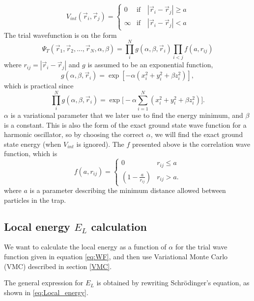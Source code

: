 \documentclass[norsk,a4paper,12pt]{article}
\begin{document}
\begin{equation}
\label{eq:V_int}
V_{int}(\vec{r}_i, \vec{r}_j)=
\begin{cases} 
0 & \text{if}\quad |\vec{r}_i-\vec{r}_j| \geq a \\
\infty & \text{if}\quad |\vec{r}_i-\vec{r}_j| < a
\end{cases}
\end{equation}
The trial wavefunction is on the form 
\begin{equation}
\Psi_T(\vec{r}_1, \vec{r}_2, ..., \vec{r}_N, \alpha, \beta)=\prod_i^Ng(\alpha, \beta, \vec{r}_i)\prod_{i<j}f(a,r_{ij})
\label{eq:WF}
\end{equation}
where $r_{ij}=|\vec{r}_i-\vec{r}_j|$ and $g$ is assumed to be an exponential function,
\begin{equation}
g(\alpha, \beta, \vec{r}_i)=\exp[-\alpha(x_i^2+y_i^2+\beta z_i^2)],
\end{equation}
which is practical since
\begin{equation}
\prod_i^Ng(\alpha, \beta, \vec{r}_i)=\exp\Big[-\alpha\sum_{i=1}^N(x_i^2+y_i^2+\beta z_i^2)\Big].
\end{equation}
$\alpha$ is a variational parameter that we later use to find the energy minimum, and $\beta$ is a constant. This is also the form of the exact ground state wave function for a harmonic oscillator, so by choosing the correct $\alpha$, we will find the exact ground state energy (when $V_{int}$ is ignored). The $f$ presented above is the correlation wave function, which is 
\begin{equation}
\label{eq:WF_interaction_part}
f(a,r_{ij})=
\begin{cases} 
   0 & r_{ij} \leq a \\
   \left(1-\frac{a}{r_{ij}}\right) & r_{ij} > a.
\end{cases}
\end{equation}
where $a$ is a parameter describing the minimum distance allowed between particles in the trap.

\subsection{Local energy $E_L$ calculation}

We want to calculate the local energy as a function of $\alpha$ for the trial wave function given in equation \ref{eq:WF}, and then use Variational Monte Carlo (VMC) described in section \ref{VMC}. 

The general expression for $E_L$ is obtained by rewriting Schr\"{o}dinger's equation, as shown in \ref{eq:Local_energy}.
\end{document}
